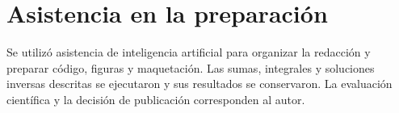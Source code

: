 \section*{Asistencia en la preparación}
Se utilizó asistencia de inteligencia artificial para organizar la redacción y preparar código, figuras y maquetación. Las sumas, integrales y soluciones inversas descritas se ejecutaron y sus resultados se conservaron. La evaluación científica y la decisión de publicación corresponden al autor.
